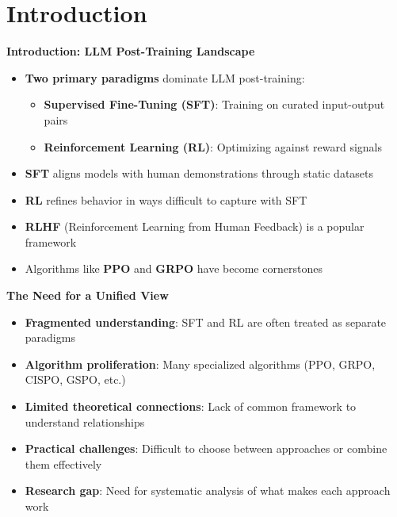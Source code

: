 \section{Introduction}%
\begin{frame}
\begin{center}
\Large \textbf{Introduction: LLM Post-Training Landscape}
\end{center}

\vspace{0.5cm}

\begin{itemize}
    \item \textbf{Two primary paradigms} dominate LLM post-training:
    \begin{itemize}
        \item \textbf{Supervised Fine-Tuning (SFT)}: Training on curated input-output pairs
        \item \textbf{Reinforcement Learning (RL)}: Optimizing against reward signals
    \end{itemize}
    
    \item \textbf{SFT} aligns models with human demonstrations through static datasets
    
    \item \textbf{RL} refines behavior in ways difficult to capture with SFT
    
    \item \textbf{RLHF} (Reinforcement Learning from Human Feedback) is a popular framework
    
    \item Algorithms like \textbf{PPO} and \textbf{GRPO} have become cornerstones
\end{itemize}
\end{frame}%
\begin{frame}
\begin{center}
\Large \textbf{The Need for a Unified View}
\end{center}

\vspace{0.5cm}

\begin{itemize}
    \item \textbf{Fragmented understanding}: SFT and RL are often treated as separate paradigms
    
    \item \textbf{Algorithm proliferation}: Many specialized algorithms (PPO, GRPO, CISPO, GSPO, etc.)
    
    \item \textbf{Limited theoretical connections}: Lack of common framework to understand relationships
    
    \item \textbf{Practical challenges}: Difficult to choose between approaches or combine them effectively
    
    \item \textbf{Research gap}: Need for systematic analysis of what makes each approach work
\end{itemize}
\end{frame}%
